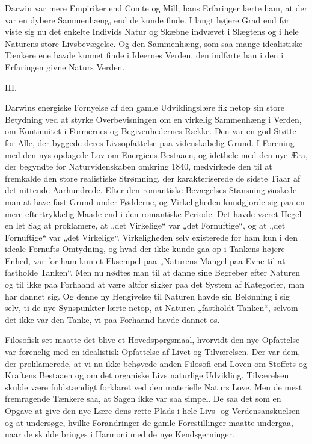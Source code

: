 \documentclass[12pt,a4paper,openany]{book}
\newcommand{\opage}[1]{\marginnote{\footnotesize\textit{[#1]}}}
\begin{document}
Darwin var mere Empiriker end Comte og Mill; hans Erfaringer
lærte ham, at der var en dybere Sammenhæng, end
de kunde finde. I langt højere Grad end før viste sig nu det
enkelte Individs Natur og Skæbne indvævet i Slægtens og
i hele Naturens store Livsbevægelse. Og den Sammenhæng,
som saa mange idealistiske Tænkere ene havde kunnet finde
i Ideernes Verden, den indførte han i den i Erfaringen givne
Naturs Verden.

\begin{center}III.\end{center}


Darwins energiske Fornyelse af den gamle Udviklingslære
fik netop sin store Betydning ved at styrke Overbevisningen
om en virkelig Sammenhæng i Verden, om Kontinuitet i Formernes
og Begivenhedernes Række. Den var en god Støtte
for Alle, der byggede deres Livsopfattelse paa videnskabelig
Grund. I Forening med den nys opdagede Lov om Energiens
Bestaaen, og idethele med den nye Æra, der begyndte for
Naturvidenskaben omkring 1840, medvirkede den til at fremkalde
den store realistiske Strømning, der karakteriserede de
sidste Tiaar af det nittende Aarhundrede. Efter den romantiske
Bevægelses Stansning ønskede man at have fast Grund under
Fødderne, og Virkeligheden kundgjorde sig paa en mere eftertrykkelig
Maade end i den romantiske Periode. Det havde
været Hegel en let Sag at proklamere, at „det Virkelige“ var
„det Fornuftige“, og at „det Fornuftige“ var „det Virkelige“.
Virkeligheden selv existerede for ham kun i den ideale Fornufts
Omtydning, og hvad der ikke kunde gaa op i Tankens
højere Enhed, var for ham kun et Eksempel paa „Naturens
Mangel paa Evne til at fastholde Tanken“. Men nu nødtes
man til at danne sine Begreber efter Naturen og til ikke paa
Forhaand at være altfor sikker paa det System af Kategorier,
man har dannet sig. Og denne ny Hengivelse til Naturen
havde sin Belønning i sig selv, ti de nye Synspunkter lærte
\setcounter{footnote}{0}%
\opage{209}netop, at Naturen „fastholdt Tanken“, selvom det ikke var
den Tanke, vi paa Forhaand havde dannet os. ---

Filosofisk set maatte det blive et Hovedspørgsmaal, hvorvidt
den nye Opfattelse var forenelig med en idealistisk Opfattelse
af Livet og Tilværelsen. Der var dem, der proklamerede,
at vi nu ikke behøvede anden Filosofi end Loven om
Stoffets og Kraftens Bestaaen og om det organiske Livs naturlige
Udvikling. Tilværelsen skulde være fuldstændigt forklaret
ved den materielle Naturs Love. Men de mest fremragende
Tænkere saa, at Sagen ikke var saa simpel. De saa det som
en Opgave at give den nye Lære dens rette Plads i hele Livs- og
Verdensanskuelsen og at undersøge, hvilke Forandringer de
gamle Forestillinger maatte undergaa, naar de skulde bringes i
Harmoni med de nye Kendsgerninger.
\end{document}
